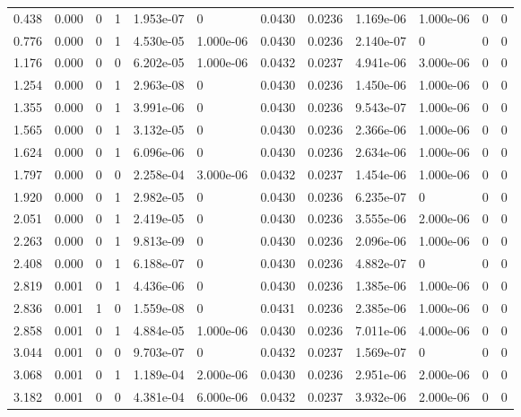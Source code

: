 \documentclass[preview]{standalone}
\begin{document}
{{\begin{tabular}{L{1.2cm}C{1.2cm} C{0.3cm}C{0.5cm} C{1.4cm}C{1.4cm} C{1.4cm}C{1.4cm} C{1.6cm}C{1.6cm} C{1.6cm}C{1.6cm}}
  0.438  &  0.000  & 0     &  1 &  1.953e-07  & 0  &  0.0430&   0.0236& 1.169e-06 & 1.000e-06   &  0 & 0  \\ 
  0.776  &  0.000  & 0     &  1 &  4.530e-05  & 1.000e-06  &  0.0430&   0.0236& 2.140e-07 & 0   &  0 & 0  \\ 
  1.176  &  0.000  & 0     &  0 &  6.202e-05  & 1.000e-06  &  0.0432&   0.0237& 4.941e-06 & 3.000e-06   &  0 & 0  \\ 
  1.254  &  0.000  & 0     &  1 &  2.963e-08  & 0  &  0.0430&   0.0236& 1.450e-06 & 1.000e-06   &  0 & 0  \\ 
  1.355  &  0.000  & 0     &  1 &  3.991e-06  & 0  &  0.0430&   0.0236& 9.543e-07 & 1.000e-06   &  0 & 0  \\ 
  1.565  &  0.000  & 0     &  1 &  3.132e-05  & 0  &  0.0430&   0.0236& 2.366e-06 & 1.000e-06   &  0 & 0  \\ 
  1.624  &  0.000  & 0     &  1 &  6.096e-06  & 0  &  0.0430&   0.0236& 2.634e-06 & 1.000e-06   &  0 & 0  \\ 
  1.797  &  0.000  & 0     &  0 &  2.258e-04  & 3.000e-06  &  0.0432&   0.0237& 1.454e-06 & 1.000e-06   &  0 & 0  \\ 
  1.920  &  0.000  & 0     &  1 &  2.982e-05  & 0  &  0.0430&   0.0236& 6.235e-07 & 0   &  0 & 0  \\ 
  2.051  &  0.000  & 0     &  1 &  2.419e-05  & 0  &  0.0430&   0.0236& 3.555e-06 & 2.000e-06   &  0 & 0  \\ 
  2.263  &  0.000  & 0     &  1 &  9.813e-09  & 0  &  0.0430&   0.0236& 2.096e-06 & 1.000e-06   &  0 & 0  \\ 
  2.408  &  0.000  & 0     &  1 &  6.188e-07  & 0  &  0.0430&   0.0236& 4.882e-07 & 0   &  0 & 0  \\ 
  2.819  &  0.001  & 0     &  1 &  4.436e-06  & 0  &  0.0430&   0.0236& 1.385e-06 & 1.000e-06   &  0 & 0  \\ 
  2.836  &  0.001  & 1     &  0 &  1.559e-08  & 0  &  0.0431&   0.0236& 2.385e-06 & 1.000e-06   &  0 & 0  \\ 
  2.858  &  0.001  & 0     &  1 &  4.884e-05  & 1.000e-06  &  0.0430&   0.0236& 7.011e-06 & 4.000e-06   &  0 & 0  \\ 
  3.044  &  0.001  & 0     &  0 &  9.703e-07  & 0  &  0.0432&   0.0237& 1.569e-07 & 0   &  0 & 0  \\ 
  3.068  &  0.001  & 0     &  1 &  1.189e-04  & 2.000e-06  &  0.0430&   0.0236& 2.951e-06 & 2.000e-06   &  0 & 0  \\ 
  3.182  &  0.001  & 0     &  0 &  4.381e-04  & 6.000e-06  &  0.0432&   0.0237& 3.932e-06 & 2.000e-06   &  0 & 0  \\ 

\end{tabular}}}
\end{document}
